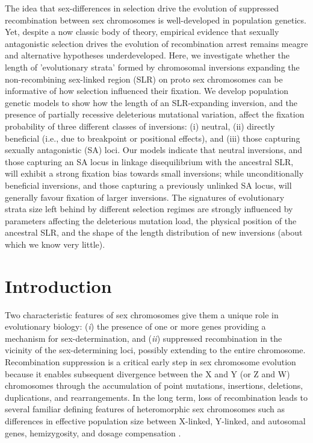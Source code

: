 \documentclass{article}[12pt]
\begin{document}
\noindent The idea that sex-differences in selection drive the evolution of suppressed recombination between sex chromosomes is well-developed in population genetics. Yet, despite a now classic body of theory, empirical evidence that sexually antagonistic selection drives the evolution of recombination arrest remains meagre and alternative hypotheses underdeveloped. Here, we investigate whether the length of 'evolutionary strata' formed by chromosomal inversions expanding the non-recombining sex-linked region (SLR) on proto sex chromosomes can be informative of how selection influenced their fixation. We develop population genetic models to show how the length of an SLR-expanding inversion, and the presence of partially recessive deleterious mutational variation, affect the fixation probability of three different classes of inversions: (i) neutral, (ii) directly beneficial (i.e., due to breakpoint or positional effects), and (iii) those capturing sexually antagonistic (SA) loci. Our models indicate that neutral inversions, and those capturing an SA locus in linkage disequilibrium with the ancestral SLR, will exhibit a strong fixation bias towards small inversions; while unconditionally beneficial inversions, and those capturing a previously unlinked SA locus, will generally favour fixation of larger inversions. The signatures of evolutionary strata size left behind by different selection regimes are strongly influenced by parameters affecting the deleterious mutation load, the physical position of the ancestral SLR, and the shape of the length distribution of new inversions (about which we know very little).


\newpage{}


\section*{Introduction} \label{sec:Introduction}

Two characteristic features of sex chromosomes give them a unique role in evolutionary biology: ({\itshape i}) the presence of one or more genes providing a mechanism for sex-determination, and ({\itshape ii}) suppressed recombination in the vicinity of the sex-determining loci, possibly extending to the entire chromosome. Recombination suppression is a critical early step in sex chromosome evolution because it enables subsequent divergence between the X and Y (or Z and W) chromosomes through the accumulation of point mutations, insertions, deletions, duplications, and rearrangements. In the long term, loss of recombination leads to several familiar defining features of heteromorphic sex chromosomes such as differences in effective population size between X-linked, Y-linked, and autosomal genes, hemizygosity, and dosage compensation \citep{CharlesworthMarais2005, BergeroCharlesworth2009,BeukeboomPerrin2014,LenormandRoze2022}.
	
\end{document}
